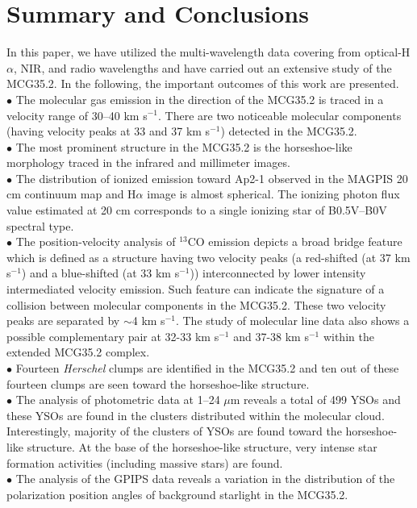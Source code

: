 \documentclass[iop]{emulateapj}
\begin{document}
\section{Summary and Conclusions}
\label{sec:conc}
In this paper, we have utilized the multi-wavelength data covering from optical-H$\alpha$, NIR, and radio wavelengths and have carried out 
an extensive study of the MCG35.2. In the following, the important outcomes of this work are presented.\\
$\bullet$ The molecular gas emission in the direction of the MCG35.2 is traced in a velocity range of 30--40 km s$^{-1}$. There are two noticeable molecular components (having velocity peaks at 33 and 37 km s$^{-1}$) detected in the MCG35.2.\\
$\bullet$ The most prominent structure in the MCG35.2 is the horseshoe-like morphology traced in the infrared and millimeter images.\\ 
$\bullet$ The distribution of ionized emission toward Ap2-1 observed in the MAGPIS 20 cm continuum map and H$\alpha$ image is 
almost spherical. The ionizing photon flux value estimated at 20 cm corresponds to a single ionizing star of B0.5V--B0V spectral type.\\
$\bullet$ The position-velocity analysis of $^{13}$CO emission depicts a broad bridge feature which is defined as a structure 
having two velocity peaks (a red-shifted (at 37 km s$^{-1}$) and a blue-shifted (at 33 km s$^{-1}$)) interconnected by lower intensity intermediated velocity emission. 
Such feature can indicate the signature of a collision between molecular components in the MCG35.2. 
These two velocity peaks are separated by $\sim$4 km s$^{-1}$. 
The study of molecular line data also shows a possible complementary pair at 32-33 km s$^{-1}$ and 37-38 km s$^{-1}$ within the extended MCG35.2 complex.\\ 
$\bullet$ Fourteen {\it Herschel} clumps are identified in the MCG35.2 and ten out of these fourteen clumps are seen toward the horseshoe-like structure.\\  
$\bullet$ The analysis of photometric data at 1--24 $\mu$m reveals a total of 499 YSOs and these YSOs are found in the clusters 
distributed within the molecular cloud. Interestingly, majority of the clusters of YSOs are found toward the horseshoe-like structure. 
At the base of the horseshoe-like structure, very intense star formation activities (including massive stars) are found.\\
$\bullet$ The analysis of the GPIPS data reveals a variation in the distribution of the polarization position angles of background starlight in the MCG35.2.\\
\end{document}
